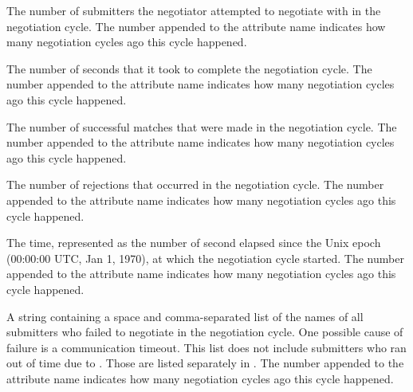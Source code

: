 \begin{description}
\label{attr:LastNegotiationCycleActiveSubmitterCountX}
\item[\AdAttr{LastNegotiationCycleActiveSubmitterCountX}:] The number of submitters
  the negotiator attempted to negotiate with in the negotiation cycle.
  The number  appended to the attribute name indicates how
  many negotiation cycles ago this cycle happened.

\item[\AdAttr{LastNegotiationCycleDurationX}:] The number of seconds
  that it took to complete the negotiation cycle.  The number 
  appended to the attribute name indicates how many negotiation cycles
  ago this cycle happened.

\item[\AdAttr{LastNegotiationCycleMatchesX}:] The number of successful
  matches that were made in the negotiation cycle.  The number 
  appended to the attribute name indicates how many negotiation cycles
  ago this cycle happened.

\item[\AdAttr{LastNegotiationCycleDurationX}:] The number of
  rejections that occurred in the negotiation cycle.  The number 
  appended to the attribute name indicates how many negotiation cycles
  ago this cycle happened.

\item[\AdAttr{LastNegotiationCycleStartTimeX}:]
  The time, represented as the number of second elapsed since the Unix
  epoch (00:00:00 UTC, Jan 1, 1970), at which the negotiation cycle
  started.  The number  appended to the attribute name
  indicates how many negotiation cycles ago this cycle happened.

\item[\AdAttr{LastNegotiationCycleSubmittersFailedX}:] A string containing
  a space and comma-separated list of the names of all submitters who
  failed to negotiate in the negotiation cycle.  One possible cause of
  failure is a communication timeout.  This list does not include
  submitters who ran out of time due
  to .  Those are listed
  separately in .
  The number  appended to the attribute name indicates how
  many negotiation cycles ago this cycle happened.


\end{description}
